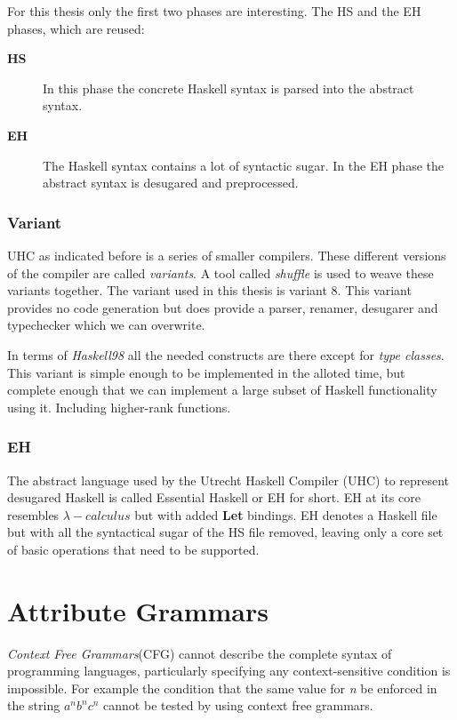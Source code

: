 \documentclass[twoside, titlepage, openright, a4paper]{book}
\begin{document}
For this thesis only the first two phases are interesting. The HS and the EH phases, which are reused:
\begin{description}
\item[\textbf{HS}] In this phase the concrete Haskell syntax is parsed into the abstract syntax. 
\item[\textbf{EH}] The Haskell syntax contains a lot of syntactic sugar. In the EH phase the abstract syntax is desugared and preprocessed.
\end{description}
\subsection{Variant}
UHC as indicated before is a series of smaller compilers. These different versions of the compiler are called \emph{variants}. A tool called \emph{shuffle} is used to weave these variants together. The variant used in this thesis is variant 8. This variant provides no code generation but does provide a parser, renamer, desugarer and typechecker which we can overwrite.

In terms of \emph{Haskell98} all the needed constructs are there except for \emph{type classes}. This variant is simple enough to be implemented in the alloted time, but complete enough that we can implement a large subset of Haskell functionality using it. Including higher-rank functions.

\subsection{EH}
The abstract language used by the Utrecht Haskell Compiler (UHC) to represent desugared Haskell is called Essential Haskell or EH for short. EH at its core resembles $\lambda-calculus$ but with added \textbf{Let} bindings. EH denotes a Haskell file but with all the syntactical sugar of the HS file removed, leaving only a core set of basic operations that need to be supported.

\chapter{Attribute Grammars}
\emph{Context Free Grammars}(CFG) cannot describe the complete syntax of programming languages\cite{knuth1}, particularly specifying any context-sensitive condition is impossible. For example the condition that the same value for \emph{n} be enforced in the string $a^nb^nc^n$ cannot be tested by using context free grammars\cite{ken}.
\end{document}
